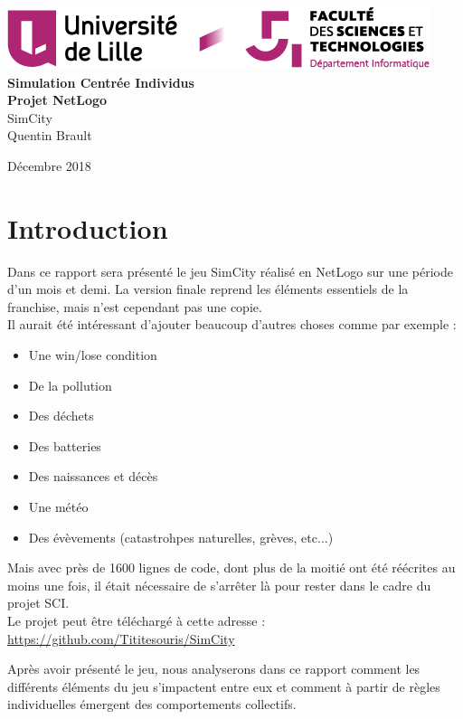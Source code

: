 \documentclass[11pt]{report}
\begin{document}
\begin{titlepage}
	\centering
	\includegraphics[scale=0.8]{logo}\\
	\vspace{5cm}
	{\Huge{ \bf{Simulation Centrée Individus}}}\\
	\vspace{0.5cm}
   	{\Huge{\bf {Projet NetLogo}}}\\
	\vspace{2cm}
   	{\huge{SimCity}}\\
	\vspace{3cm}
   	{\large{Quentin Brault}}
	\vfill
	{\large Décembre 2018\par}
\end{titlepage}

\tableofcontents
\newpage

\chapter*{Introduction}


Dans ce rapport sera présenté le jeu SimCity réalisé en NetLogo sur une période d'un mois et demi. La version finale reprend les éléments essentiels de la franchise, mais n'est cependant pas une copie.\\
Il aurait été intéressant d'ajouter beaucoup d'autres choses comme par exemple :
\begin{itemize}
	\item Une win/lose condition
	\item De la pollution
	\item Des déchets
	\item Des batteries
	\item Des naissances et décès
	\item Une météo
	\item Des évèvements (catastrohpes naturelles, grèves, etc...)
\end{itemize}
Mais avec près de 1600 lignes de code, dont plus de la moitié ont été réécrites au moins une fois, il était nécessaire de s'arrêter là pour rester dans le cadre du projet SCI.\\
Le projet peut être téléchargé à cette adresse :\\
\url{https://github.com/Tititesouris/SimCity}\\
\par
Après avoir présenté le jeu, nous analyserons dans ce rapport comment les différents éléments du jeu s'impactent entre eux et comment à partir de règles individuelles émergent des comportements collectifs.
\end{document}
